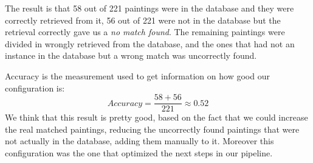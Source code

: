 The result is that 58 out of 221 paintings were in the database and they were correctly retrieved from it, 56 out of 221 were not in the database but the retrieval correctly gave us a \emph{no match found}. The remaining paintings were divided in wrongly retrieved from the database, and the ones that had not an instance in the database but a wrong match was uncorrectly found.

Accuracy is the measurement used to get information on how good our configuration is: \[ Accuracy = \frac{58+56}{221} \approx 0.52 \]
We think that this result is pretty good, based on the fact that we could increase the real matched paintings, reducing the uncorrectly found paintings that were not actually in the database, adding them manually to it. Moreover this configuration was the one that optimized the next steps in our pipeline.

